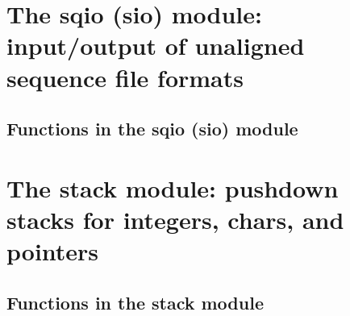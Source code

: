 \documentclass[11pt]{article}
\begin{document}
\newpage
\section{The sqio (sio) module: input/output of unaligned sequence file formats}

\subsection{Functions in the sqio (sio) module}


\newpage
\section{The stack module: pushdown stacks for integers, chars, and pointers}

\subsection{Functions in the stack module}

\end{document}
